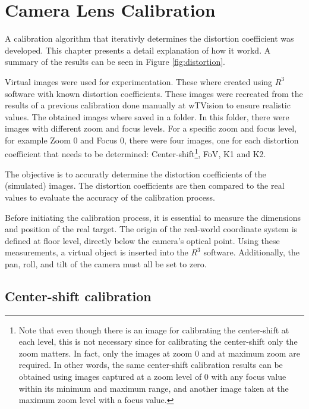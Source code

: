 \chapter{Camera Lens Calibration} \label{chap:Camera Lens calibration}

\noindent A calibration algorithm that iterativly determines the distortion coefficient was developed. This chapter presents a detail explanation of how it workd. A summary of the results can be seen in Figure \ref{fig:distortion}.

\noindent Virtual images were used for experimentation. These where created using $R^3$ software with known distortion coefficients. 
These images were recreated from the results of a previous calibration done manually at wTVision to ensure realistic values. The 
obtained images where saved in a folder. In this folder, there were images with different zoom and focus levels.
For a specific zoom and focus level, for example Zoom 0 and Focus 0, there were four images, one for each distortion coefficient
that needs to be determined: Center-shift\footnote{Note that even though there is an image for calibrating the center-shift at each level, this is not necessary since for calibrating the center-shift only the zoom matters. In fact, only the images at zoom 0 and at maximum zoom are required. In other words, the same center-shift calibration results can be obtained using images captured at a zoom level of 0 with any focus value within its minimum and maximum range, and another image taken at the maximum zoom level with a focus value.}, \ac{FoV}, K1 and K2.

\noindent The objective is to accuratly determine the distortion coefficients of the (simulated) images. The distortion coefficients are then compared to the real values to evaluate the accuracy of the calibration process.

\noindent Before initiating the calibration process, it is essential to measure the dimensions and position of the real target. The origin of the real-world coordinate system is defined at floor level, directly below the camera's optical point. Using these measurements, a virtual object is inserted into the \( R^3 \) software. Additionally, the pan, roll, and tilt of the camera must all be set to zero.

\section{Center-shift calibration} \label{sec:Center-shift calibration}

